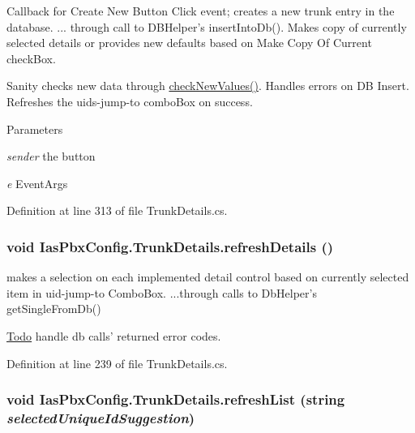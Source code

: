 Callback for Create New Button Click event; creates a new trunk entry in the database. ... through call to DBHelper's insertIntoDb(). Makes copy of currently selected details or provides new defaults based on Make Copy Of Current checkBox.

Sanity checks new data through \hyperlink{class_ias_pbx_config_1_1_trunk_details_acdc7d06a5f58918faabd4057300585d3}{checkNewValues()}. Handles errors on DB Insert. Refreshes the uids-\/jump-\/to comboBox on success.


\begin{DoxyParams}{Parameters}
\item[{\em sender}]the button \item[{\em e}]EventArgs \end{DoxyParams}


Definition at line 313 of file TrunkDetails.cs.\hypertarget{class_ias_pbx_config_1_1_trunk_details_aacce011c33fa9fed315eb27c9d9643ea}{
\subsubsection[{refreshDetails}]{\setlength{\rightskip}{0pt plus 5cm}void IasPbxConfig.TrunkDetails.refreshDetails ()}}
\label{class_ias_pbx_config_1_1_trunk_details_aacce011c33fa9fed315eb27c9d9643ea}


makes a selection on each implemented detail control based on currently selected item in uid-\/jump-\/to ComboBox. ...through calls to DbHelper's getSingleFromDb() \begin{Desc}
\item[\hyperlink{todo__todo000047}{Todo}]handle db calls' returned error codes. \end{Desc}


Definition at line 239 of file TrunkDetails.cs.\hypertarget{class_ias_pbx_config_1_1_trunk_details_ab5c0db30702c3714191a3161c15bbbe5}{
\subsubsection[{refreshList}]{\setlength{\rightskip}{0pt plus 5cm}void IasPbxConfig.TrunkDetails.refreshList (string {\em selectedUniqueIdSuggestion})}}
\label{class_ias_pbx_config_1_1_trunk_details_ab5c0db30702c3714191a3161c15bbbe5}


